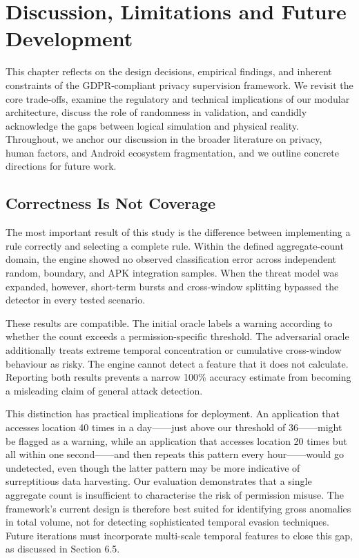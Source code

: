 \newpage
\section{Discussion, Limitations and Future Development}

This chapter reflects on the design decisions, empirical findings, and inherent constraints of the GDPR‑compliant privacy supervision framework. We revisit the core trade‑offs, examine the regulatory and technical implications of our modular architecture, discuss the role of randomness in validation, and candidly acknowledge the gaps between logical simulation and physical reality. Throughout, we anchor our discussion in the broader literature on privacy, human factors, and Android ecosystem fragmentation, and we outline concrete directions for future work.

\subsection{Correctness Is Not Coverage}

The most important result of this study is the difference between implementing a rule correctly and selecting a complete rule. Within the defined aggregate-count domain, the engine showed no observed classification error across independent random, boundary, and APK integration samples. When the threat model was expanded, however, short-term bursts and cross-window splitting bypassed the detector in every tested scenario.

These results are compatible. The initial oracle labels a warning according to whether the count exceeds a permission-specific threshold. The adversarial oracle additionally treats extreme temporal concentration or cumulative cross-window behaviour as risky. The engine cannot detect a feature that it does not calculate. Reporting both results prevents a narrow 100\% accuracy estimate from becoming a misleading claim of general attack detection.

This distinction has practical implications for deployment. An application that accesses location 40 times in a day——just above our threshold of 36——might be flagged as a warning, while an application that accesses location 20 times but all within one second——and then repeats this pattern every hour——would go undetected, even though the latter pattern may be more indicative of surreptitious data harvesting. Our evaluation demonstrates that a single aggregate count is insufficient to characterise the risk of permission misuse. The framework's current design is therefore best suited for identifying gross anomalies in total volume, not for detecting sophisticated temporal evasion techniques. Future iterations must incorporate multi-scale temporal features to close this gap, as discussed in Section 6.5.

